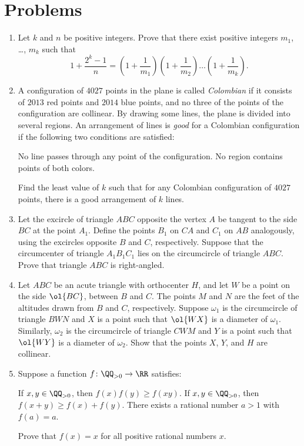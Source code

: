\documentclass[11pt]{scrartcl}
\begin{document}
\section{Problems}
\begin{enumerate}[\bfseries 1.]
\item %
Let  $k$ and $n$ be positive integers.
Prove that there exist positive integers $m_1$, \dots, $m_k$
such that
\[ 1 + \frac{2^k-1}{n} = \left( 1 + \frac{1}{m_1} \right) \left( 1 + \frac{1}{m_2} \right)
  \dots \left( 1 + \frac{1}{m_k} \right). \]

\item %
A configuration of $4027$ points in the plane is called
\emph{Colombian} if it consists of $2013$ red points and $2014$ blue points,
and no three of the points of the configuration are collinear.
By drawing some lines, the plane is divided into several regions.
An arrangement of lines is \emph{good} for a Colombian configuration
if the following two conditions are satisfied:
\begin{enumerate}
  \ii[(i)] No line passes through any point of the configuration.
  \ii[(ii)] No region contains points of both colors.
\end{enumerate}
Find the least value of $k$ such that for any Colombian configuration
of $4027$ points, there is a good arrangement of $k$ lines.

\item %
Let the excircle of triangle $ABC$ opposite
the vertex $A$ be tangent to the side $BC$ at the point $A_1$.
Define the points $B_1$ on $CA$ and $C_1$ on $AB$ analogously,
using the excircles opposite $B$ and $C$, respectively.
Suppose that the circumcenter of triangle $A_1B_1C_1$ lies
on the circumcircle of triangle $ABC$.
Prove that triangle $ABC$ is right-angled.

\item %
Let $ABC$ be an acute triangle with orthocenter $H$,
and let $W$ be a point on the side $\ol{BC}$, between $B$ and $C$.
The points $M$ and $N$ are the feet of the altitudes
drawn from $B$ and $C$, respectively.
Suppose $\omega_1$ is the circumcircle of triangle $BWN$
and $X$ is a point such that $\ol{WX}$ is a diameter of $\omega_1$.
Similarly, $\omega_2$ is the circumcircle of triangle $CWM$
and $Y$ is a point such that $\ol{WY}$ is a diameter of $\omega_2$.
Show that the points $X$, $Y$, and $H$ are collinear.

\item %
Suppose a function $f \colon \QQ_{>0} \to \RR$ satisfies:
\begin{enumerate}
  \ii [(i)] If $x,y \in \QQ_{>0}$, then $f(x)f(y) \ge f(xy)$.
  \ii [(ii)] If $x,y \in \QQ_{>0}$, then $f(x+y) \ge f(x) + f(y)$.
  \ii [(iii)] There exists a rational number $a > 1$ with $f(a) = a$.
\end{enumerate}
Prove that $f(x) = x$ for all positive rational numbers $x$.


\end{enumerate}
\end{document}
